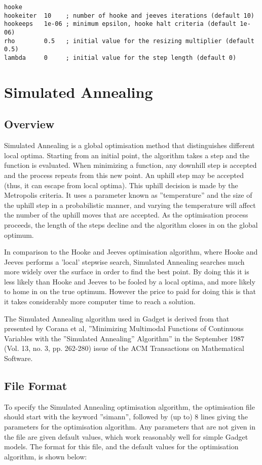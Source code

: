 \documentclass [a4paper, 10pt]{book}
\begin{document}
{\small\begin{verbatim}
hooke
hookeiter  10    ; number of hooke and jeeves iterations (default 10)
hookeeps   1e-06 ; minimum epsilon, hooke halt criteria (default 1e-06)
rho        0.5   ; initial value for the resizing multiplier (default 0.5)
lambda     0     ; initial value for the step length (default 0)
\end{verbatim}}

\section{Simulated Annealing}\label{sec:simann}
\subsection{Overview}
Simulated Annealing is a global optimisation method that distinguishes different local optima.  Starting from an initial point, the algorithm takes a step and the function is evaluated.  When minimizing a function, any downhill step is accepted and the process repeats from this new point.  An uphill step may be accepted (thus, it can escape from local optima).  This uphill decision is made by the Metropolis criteria.  It uses a parameter known as ''temperature'' and the size of the uphill step in a probabilistic manner, and varying the temperature will affect the number of the uphill moves that are accepted.  As the optimisation process proceeds, the length of the steps decline and the algorithm closes in on the global optimum.

\bigskip
In comparison to the Hooke and Jeeves optimisation algorithm, where Hooke and Jeeves performs a 'local' stepwise search, Simulated Annealing searches much more widely over the surface in order to find the best point.  By doing this it is less likely than Hooke and Jeeves to be fooled by a local optima, and more likely to home in on the true optimum.  However the price to paid for doing this is that it takes considerably more computer time to reach a solution.

\bigskip
The Simulated Annealing algorithm used in Gadget is derived from that presented by Corana et al, ''Minimizing Multimodal Functions of Continuous Variables with the ''Simulated Annealing'' Algorithm'' in the September 1987 (Vol. 13, no. 3, pp. 262-280) issue of the ACM Transactions on Mathematical Software.

\subsection{File Format}
To specify the Simulated Annealing optimisation algorithm, the optimisation file should start with the keyword ''simann'', followed by (up to) 8 lines giving the parameters for the optimisation algorithm.  Any parameters that are not given in the file are given default values, which work reasonably well for simple Gadget models.  The format for this file, and the default values for the optimisation algorithm, is shown below:
\end{document}
